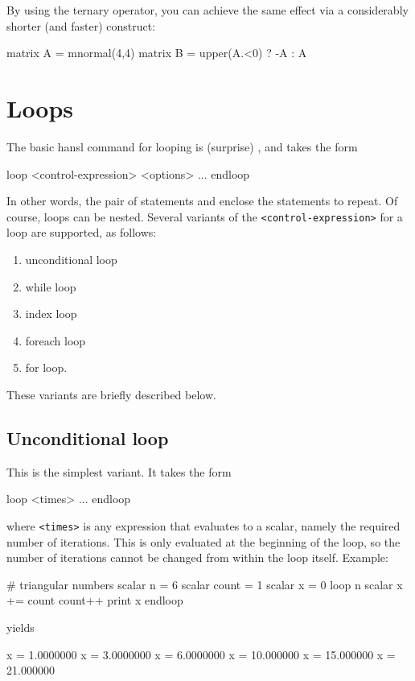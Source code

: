 By using the ternary operator, you can achieve the same effect via a
considerably shorter (and faster) construct:
\begin{code}
matrix A = mnormal(4,4)
matrix B = upper(A.<0) ? -A : A
\end{code}


\section{Loops}
\label{sec:hr-loops}

The basic hansl command for looping is (surprise) , and
takes the form
\begin{code}
loop <control-expression> <options>
    ...
endloop
\end{code}
In other words, the pair of statements  and 
enclose the statements to repeat. Of course, loops can be nested.
Several variants of the \texttt{<control-expression>} for a loop are
supported, as follows:
\begin{enumerate}
\item unconditional loop
\item while loop
\item index loop
\item foreach loop
\item for loop.
\end{enumerate}
These variants are briefly described below.

\subsection{Unconditional loop}

This is the simplest variant. It takes the form
\begin{code}
loop <times>
   ...
endloop
\end{code}
where \texttt{<times>} is any expression that evaluates to a scalar,
namely the required number of iterations. This is only evaluated at
the beginning of the loop, so the number of iterations cannot be
changed from within the loop itself. Example:
\begin{code}
# triangular numbers
scalar n = 6
scalar count = 1
scalar x = 0
loop n
    scalar x += count
    count++
    print x
endloop
\end{code}
yields
\begin{code}
              x =  1.0000000
              x =  3.0000000
              x =  6.0000000
              x =  10.000000
              x =  15.000000
              x =  21.000000
\end{code}

